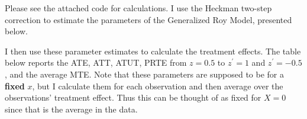 \documentclass{article}
\begin{document}
\begin{solution}
Please see the attached code for calculations. I use the Heckman two-step correction to estimate the parameters of the Generalized Roy Model, presented below.
\begin{table}[H]
    \centering
    
\end{table}

I then use these parameter estimates to calculate the treatment effects. The table below reports the ATE, ATT, ATUT, PRTE from $z=0.5$ to $z^\prime=1$ and $z^\prime=-0.5$, and the average MTE. Note that these parameters are supposed to be for a \textbf{fixed} $x$, but I calculate them for each observation and then average over the observations' treatment effect. Thus this can be thought of as fixed for $X=0$ since that is the average in the data.
\begin{table}[H]
    \centering
    
\end{table}


\end{solution}
\end{document}
